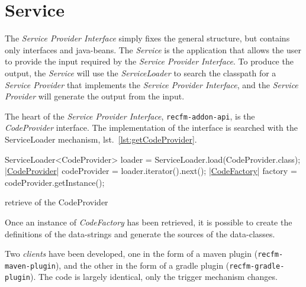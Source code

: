 %                                  

\chapter*{Service}
The \textsl{Service Provider Interface} simply fixes the general structure, but 
contains only interfaces and java-beans.
The \textsl{Service} is the application that allows the user to provide the 
input required by the \textsl{Service Provider Interface}. 
To produce the output, the \textsl{Service} will use the \textsl{ServiceLoader} 
to search the classpath for a \textsl{Service Provider} that implements the 
\textsl{Service Provider Interface}, and the \textsl{Service Provider} will 
generate the output from the input.

The heart of the \textsl{Service Provider Interface}, \verb!recfm-addon-api!, is 
the \textsl{CodeProvider} interface. The implementation of the interface is 
searched with the ServiceLoader mechanism, lst.~\ref{lst:getCodeProvider}.

\begin{elisting}[!htb]
\begin{javacode}
        ServiceLoader<CodeProvider> loader = ServiceLoader.load(CodeProvider.class);
        |\hyperref[lst:CodeProvider]{CodeProvider}| codeProvider = loader.iterator().next();
        |\hyperref[lst:CodeFactory]{CodeFactory}| factory = codeProvider.getInstance();
\end{javacode}
\caption{retrieve of the CodeProvider}
\label{lst:getCodeProvider}
\end{elisting}

Once an instance of \textsl{CodeFactory} has been retrieved, it is possible to 
create the definitions of the data-strings and generate the sources of the 
data-classes.

Two \textsl{clients} have been developed, one in the form of a maven plugin 
(\verb!recfm-maven-plugin!), and the other in the form of a gradle plugin 
(\verb!recfm-gradle-plugin!). 
The code is largely identical, only the trigger mechanism changes.
